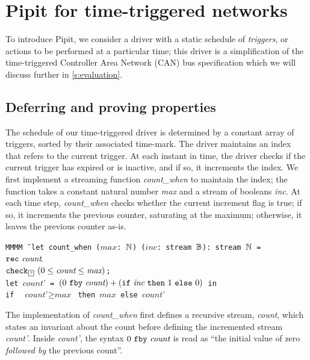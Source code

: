 \documentclass[a4paper,UKenglish,cleveref, autoref, thm-restate,anonymous]{lipics-v2021}
\begin{document}
\section{Pipit for time-triggered networks}
\label{s:motivation}



To introduce Pipit, we consider a driver with a static schedule of \emph{triggers}, or actions to be performed at a particular time; this driver is a simplification of the time-triggered Controller Area Network (CAN) bus specification \cite{fuehrer2001time} which we will discuss further in \autoref{s:evaluation}.


\subsection{Deferring and proving properties}

The schedule of our time-triggered driver is determined by a constant array of triggers, sorted by their associated time-mark.
The driver maintains an index that refers to the current trigger.
At each instant in time, the driver checks if the current trigger has expired or is inactive, and if so, it increments the index.
We first implement a streaming function \emph{count_when} to maintain the index; the function takes a constant natural number \emph{max} and a stream of booleans \emph{inc}.
At each time step, \emph{count_when} checks whether the current increment flag is true; if so, it increments the previous counter, saturating at the maximum; otherwise, it leaves the previous counter as-is.

\begin{tabbing}
  \tt{MM}\= \tt{MM} \= \kill
  \tt{let} count_when ($\textit{max}$: $\NN$) ($\textit{inc}$: stream $\BB$): stream $\NN$ = \\
    \> $\tt{rec}~\rawbind{\textit{count}}{}$ \\
    \> \> $\xcheckP{\PSUnknown}{(0 \le \textit{count} \le \textit{max})}$; \\
    \> \> \tt{let} $\textit{count'}$ \tt{=} $(0~\tt{fby}~\textit{count}) + (\tt{if}~\textit{inc}~\tt{then}~1~\tt{else}~0)$ \tt{in} \\
    \> \> \tt{if } $\textit{count'} \ge \textit{max}$ \tt{then} $\textit{max}$  \tt{else} $\textit{count'}$
\end{tabbing}

The implementation of \emph{count_when} first defines a recursive stream, \emph{count}, which states an invariant about the count before defining the incremented stream \emph{count'}.
Inside \emph{count'}, the syntax $0~\tt{fby}~\textit{count}$ is read as ``the initial value of zero \emph{followed by} the previous count''.
\end{document}
